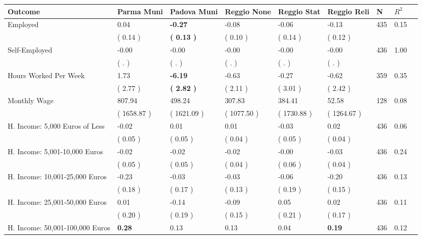 \begin{tabular}{L{6.2cm} C{1.8cm} C{1.8cm} C{1.8cm} C{1.8cm} C{1.8cm} C{1.8cm} C{0.3cm} C{0.3cm}}
\toprule
 \textbf{Outcome} & \textbf{Parma Muni} & \textbf{Padova Muni} & \textbf{Reggio None} & \textbf{Reggio Stat} & \textbf{Reggio Reli} & \textbf{N} & \textbf{$ R^2$} \\
\midrule
Employed &      0.04 & \textbf{    -0.27} &     -0.08 &     -0.06 &     -0.13  & 435 &       0.15 \\ 
 & (     0.14 ) & \textbf{(     0.13 )} & (     0.10 ) & (     0.14 ) & (     0.12 )  & \\
Self-Employed &     -0.00 &     -0.00 &     -0.00 &     -0.00 &     -0.00  & 436 &       1.00 \\ 
 & (        . ) & (        . ) & (        . ) & (        . ) & (        . )  & \\
Hours Worked Per Week &      1.73 & \textbf{    -6.19} &     -0.63 &     -0.27 &     -0.62  & 359 &       0.35 \\ 
 & (     2.77 ) & \textbf{(     2.82 )} & (     2.11 ) & (     3.01 ) & (     2.42 )  & \\
Monthly Wage &    807.94 &    498.24 &    307.83 &    384.41 &     52.58  & 128 &       0.08 \\ 
 & (  1658.87 ) & (  1621.09 ) & (  1077.50 ) & (  1730.88 ) & (  1264.67 )  & \\
H. Income: 5,000 Euros of Less &     -0.02 &      0.01 &      0.01 &     -0.03 &      0.02  & 436 &       0.06 \\ 
 & (     0.05 ) & (     0.05 ) & (     0.04 ) & (     0.05 ) & (     0.04 )  & \\
H. Income: 5,001-10,000 Euros &     -0.02 &     -0.02 &     -0.02 &     -0.00 &     -0.03  & 436 &       0.24 \\ 
 & (     0.05 ) & (     0.05 ) & (     0.04 ) & (     0.06 ) & (     0.04 )  & \\
H. Income: 10,001-25,000 Euros &     -0.23 &     -0.03 &     -0.03 &     -0.06 &     -0.20  & 436 &       0.13 \\ 
 & (     0.18 ) & (     0.17 ) & (     0.13 ) & (     0.19 ) & (     0.15 )  & \\
H. Income: 25,001-50,000 Euros &      0.01 &     -0.14 &     -0.09 &      0.05 &      0.02  & 436 &       0.11 \\ 
 & (     0.20 ) & (     0.19 ) & (     0.15 ) & (     0.21 ) & (     0.17 )  & \\
H. Income: 50,001-100,000 Euros & \textbf{     0.28} &      0.13 &      0.13 &      0.04 & \textbf{     0.19}  & 436 &       0.12 \\ 

\end{tabular}
